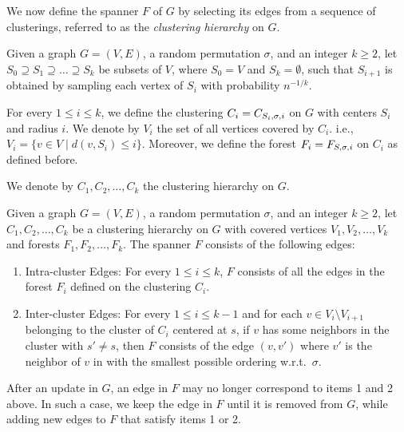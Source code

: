 We now define the spanner \( F \) of \( G \) by selecting its edges from a sequence of clusterings, referred to as the \textit{clustering hierarchy} on \( G \).

\begin{definition}
Given a graph \( G = (V, E) \), a random permutation \( \sigma \), and an integer \( k \geq 2 \), let \( S_0 \supseteq S_1 \supseteq \dots \supseteq S_k \) be subsets of \( V \), where \( S_0 = V \) and \( S_k = \emptyset \), such that \( S_{i+1} \) is obtained by sampling each vertex of \( S_i \) with probability \( n^{-1/k} \).

For every \( 1 \leq i \leq k \), we define the clustering \( C_i = C_{S_i, \sigma, i}  \) on \( G \) with centers \( S_i \) and radius \( i \).
We denote by \( V_i \) the set of all vertices covered by \( C_i \).
i.e., \( V_i = \{ v \in V \mid d(v, S_i) \leq i \} \).
Moreover, we define the forest \( F_i = F_{S, \sigma, i}  \) on \( C_i \) as defined before.

We denote by \( C_1, C_2, \dots, C_k \) the clustering hierarchy on \( G \).
\end{definition}

\begin{definition}[Spanner \( F \)] \label{def:spanner_F}
Given a graph \( G = (V, E) \), a random permutation \( \sigma \), and an integer \( k \geq 2 \), let \( C_1, C_2, \dots, C_k \) be a clustering hierarchy on \( G \) with covered vertices \( V_1, V_2, \dots, V_k \) and forests \( F_1, F_2, \dots, F_k \). 
The spanner \( F \) consists of the following edges:
\begin{enumerate}
\item 
Intra-cluster Edges: For every \( 1 \leq i \leq k \), \( F \) consists of all the edges in the forest \( F_i \) defined on the clustering \( C_i \).

\item 
Inter-cluster Edges: For every \( 1 \leq i \leq k - 1 \) and for each \( v \in V_{i} \setminus V_{i + 1} \) belonging to the cluster  of \( C_i \) centered at \( s \), if \( v \) has some neighbors in the cluster  with \( s' \neq s \), then \( F \) consists of the edge \( (v, v') \) where \( v' \) is the neighbor of \( v \) in  with the smallest possible ordering w.r.t.\ \( \sigma \).
\end{enumerate}
After an update in \( G \), an edge in \( F \) may no longer correspond to items 1 and 2 above.
In such a case, we keep the edge in \( F \) until it is removed from \( G \), while adding new edges to \( F \) that satisfy items 1 or 2. 
\end{definition}



